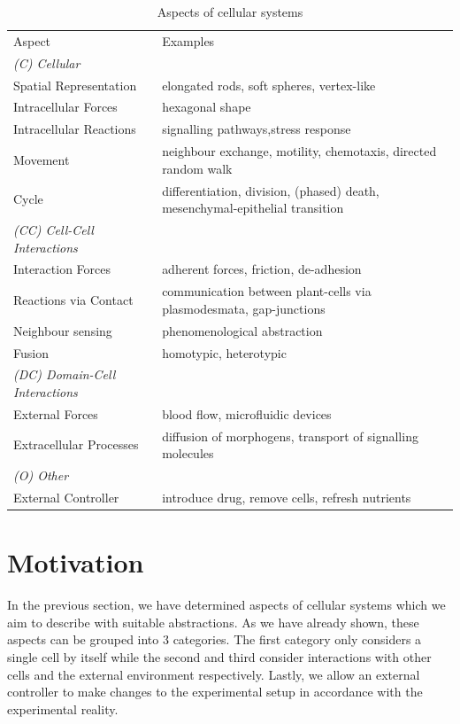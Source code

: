 \documentclass{article}
\begin{document}
\begin{table}
	\caption{Aspects of cellular systems}
	\centering
	\begin{tabular}{ll}
		\toprule
        Aspect                  &Examples\vspace{0.5em}\\
        \it{(C) Cellular}\\
        \midrule
        Spatial Representation  &elongated rods, soft spheres, vertex-like\\
        Intracellular Forces    &hexagonal shape\\
        Intracellular Reactions &signalling pathways,stress response\\
        Movement                &neighbour exchange, motility, chemotaxis, directed random walk\\
        Cycle                   &differentiation, division, (phased) death, mesenchymal-epithelial transition\vspace{0.5em}\\
        \it{(CC) Cell-Cell Interactions}\\
		\midrule
        Interaction Forces      &adherent forces, friction, de-adhesion\\
        Reactions via Contact   &communication between plant-cells via plasmodesmata, gap-junctions\\
        Neighbour sensing       &phenomenological abstraction\\
        Fusion                  &homotypic, heterotypic\vspace{0.5em}\\
        \it{(DC) Domain-Cell Interactions}\\
        \midrule
        External Forces         &blood flow, microfluidic devices\\
        Extracellular Processes &diffusion of morphogens, transport of signalling molecules\vspace{0.5em}\\
        \it{(O) Other}\\
        \midrule
        External Controller     &introduce drug, remove cells, refresh nutrients\\
		\bottomrule
	\end{tabular}
	\label{tab:table}
\end{table}

\section{Motivation}
\label{subsec:motivation}
In the previous section, we have determined aspects of cellular systems which we aim to describe
with suitable abstractions.
As we have already shown, these aspects can be grouped into 3 categories.
The first category only considers a single cell by itself while the second and third consider
interactions with other cells and the external environment respectively.
Lastly, we allow an external controller to make changes to the experimental setup in accordance with
the experimental reality.
\end{document}
